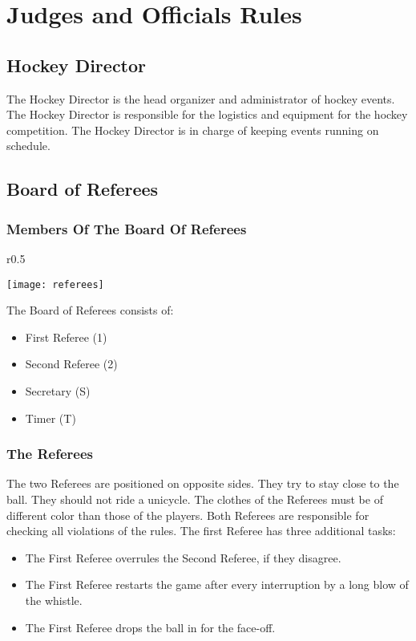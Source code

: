 \chapter{Judges and Officials Rules}

\section{Hockey Director}

The Hockey Director is the head organizer and administrator of hockey events.
The Hockey Director is responsible for the logistics and equipment for the hockey competition.
The Hockey Director is in charge of keeping events running on schedule.

\section{Board of Referees}

\subsection{Members Of The Board Of Referees}
\begin{wrapfigure}{r}{0.5\textwidth}
\begin{center}
\texttt{[image: referees]}
\end{center}
\end{wrapfigure}
 The Board of Referees consists of:
\begin{itemize}
\item First Referee (1)
\item Second Referee (2)
\item Secretary (S)
\item Timer (T)
\end{itemize}

\subsection{The Referees}
The two Referees are positioned on opposite sides.
They try to stay close to the ball.
They should not ride a unicycle.
The clothes of the Referees must be of different color than those of the players.
Both Referees are responsible for checking all violations of the rules.
The first Referee has three additional tasks:
\begin{itemize}
\item The First Referee overrules the Second Referee, if they disagree.
\item The First Referee restarts the game after every interruption by a long blow of the whistle.
\item The First Referee drops the ball in for the face-off.
\end{itemize}

